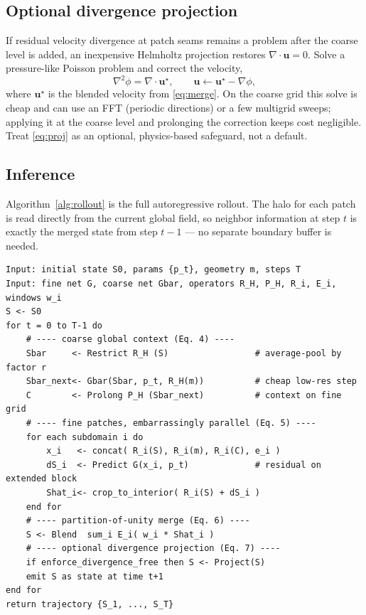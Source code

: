 \documentclass[11pt]{article}
\begin{document}
\subsection{Optional divergence projection}
If residual velocity divergence at patch seams remains a problem after the coarse
level is added, an inexpensive Helmholtz projection restores
$\nabla\!\cdot\!\bm u = 0$. Solve a pressure-like Poisson problem and correct the
velocity,
\begin{equation}
\nabla^2 \phi = \nabla\!\cdot\!\bm u^{\star}, \qquad
\bm u \leftarrow \bm u^{\star} - \nabla \phi,
\label{eq:proj}
\end{equation}
where $\bm u^{\star}$ is the blended velocity from \eqref{eq:merge}. On the
coarse grid this solve is cheap and can use an FFT (periodic directions) or a few
multigrid sweeps; applying it at the coarse level and prolonging the correction
keeps cost negligible. Treat \eqref{eq:proj} as an optional, physics-based
safeguard, not a default.

\subsection{Inference}
Algorithm~\ref{alg:rollout} is the full autoregressive rollout. The halo for each
patch is read directly from the current global field, so neighbor information at
step $t$ is exactly the merged state from step $t-1$ --- no separate boundary
buffer is needed.

\begin{algorithm}[t]
\caption{Two-level domain-decomposed rollout (inference)}
\label{alg:rollout}
\begin{lstlisting}[style=pseudo]
Input: initial state S0, params {p_t}, geometry m, steps T
Input: fine net G, coarse net Gbar, operators R_H, P_H, R_i, E_i, windows w_i
S <- S0
for t = 0 to T-1 do
    # ---- coarse global context (Eq. 4) ----
    Sbar     <- Restrict R_H (S)                 # average-pool by factor r
    Sbar_next<- Gbar(Sbar, p_t, R_H(m))          # cheap low-res step
    C        <- Prolong P_H (Sbar_next)          # context on fine grid
    # ---- fine patches, embarrassingly parallel (Eq. 5) ----
    for each subdomain i do
        x_i   <- concat( R_i(S), R_i(m), R_i(C), e_i )
        dS_i  <- Predict G(x_i, p_t)             # residual on extended block
        Shat_i<- crop_to_interior( R_i(S) + dS_i )
    end for
    # ---- partition-of-unity merge (Eq. 6) ----
    S <- Blend  sum_i E_i( w_i * Shat_i )
    # ---- optional divergence projection (Eq. 7) ----
    if enforce_divergence_free then S <- Project(S)
    emit S as state at time t+1
end for
return trajectory {S_1, ..., S_T}
\end{lstlisting}
\end{algorithm}
\end{document}
